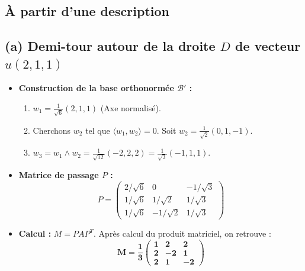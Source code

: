 \documentclass[french]{yLectureNote}
\begin{document}
\subsection{À partir d'une description}
\subsection*{(a) Demi-tour autour de la droite $D$ de vecteur $u(2, 1, 1)$}


\begin{itemize}
    \item \textbf{Construction de la base orthonormée $\mathcal{B}'$ :}
    \begin{enumerate}
        \item $w_1 = \frac{1}{\sqrt{6}}(2, 1, 1)$ (Axe normalisé).
        \item Cherchons $w_2$ tel que $\langle w_1, w_2 \rangle = 0$. Soit $w_2 = \frac{1}{\sqrt{2}}(0, 1, -1)$.
        \item $w_3 = w_1 \wedge w_2 = \frac{1}{\sqrt{12}}(-2, 2, 2) = \frac{1}{\sqrt{3}}(-1, 1, 1)$.
    \end{enumerate}
    \item \textbf{Matrice de passage $P$ :}
    \[ P = \begin{pmatrix} 2/\sqrt{6} & 0 & -1/\sqrt{3} \\ 1/\sqrt{6} & 1/\sqrt{2} & 1/\sqrt{3} \\ 1/\sqrt{6} & -1/\sqrt{2} & 1/\sqrt{3} \end{pmatrix} \]
    \item \textbf{Calcul :} $M = P A P^T$. Après calcul du produit matriciel, on retrouve :
    \[ \mathbf{M = \frac{1}{3} \begin{pmatrix} 1 & 2 & 2 \\ 2 & -2 & 1 \\ 2 & 1 & -2 \end{pmatrix}} \]
\end{itemize}
\end{document}
